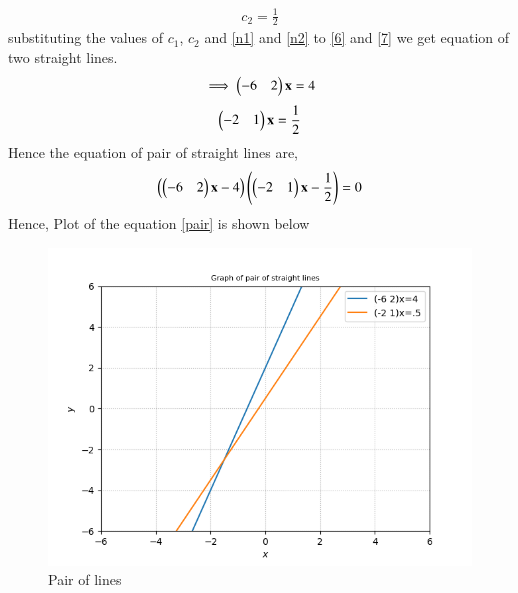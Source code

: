 \documentclass[journal,12pt,twocolumn]{IEEEtran}
\begin{document}
\begin{align}
c_2 = \frac{1}{2}
\end{align}
substituting the values of $c_1$, $c_2$ and \eqref{n1} and \eqref{n2} to \eqref{6} and \eqref{7} we get equation of two straight lines.
\begin{align}
\implies \begin{pmatrix}-6&2\end{pmatrix}\mathbf{x} = 4
\end{align}
\begin{align}
\begin{pmatrix}-2&1\end{pmatrix}\mathbf{x} = \frac{1}{2}
\end{align}
Hence the equation of pair of straight lines are,
\begin{align}
\left(\begin{pmatrix}-6&2\end{pmatrix}\mathbf{x}-4\right)\left(\begin{pmatrix}-2&1\end{pmatrix}\mathbf{x} - \frac{1}{2}\right) = 0
\label{pair}
\end{align}
Hence, Plot of the equation \eqref{pair} is shown below 
\begin{figure}[ht!]
\centering
\includegraphics[width=\columnwidth]{Figure.png}
\caption{Pair of lines}
\end{figure}

\end{document}
